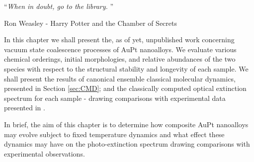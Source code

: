 


\noindent\enquote{\itshape When in doubt, go to the library. }\bigbreak

\hfill Ron Weasley - Harry Potter and the Chamber of Secrets

\vspace*{0.05\textheight}

In this chapter we shall present the, as of yet, unpublished work concerning vacuum state coalescence processes of AuPt nanoalloys. We evaluate various chemical orderings, initial morphologies, and relative abundances of the two species with respect to the structural stability and longevity of each sample. We shall present the results of canonical ensemble classical molecular dynamics, presented in Section \ref{sec:CMD}; and the classically computed optical extinction spectrum for each sample - drawing comparisons with experimental data presented in \cite{JorgeStructure}.

In brief, the aim of this chapter is to determine how composite AuPt nanoalloys may evolve subject to fixed temperature dynamics and what effect these dynamics may have on the photo-extinction spectrum drawing comparisons with experimental observations.

